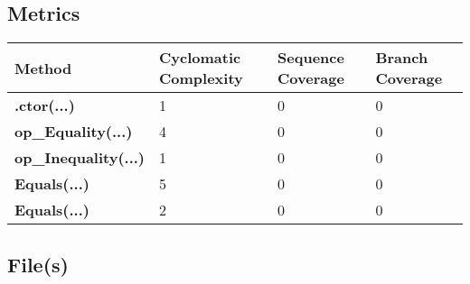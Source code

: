 \documentclass[a4paper,10pt]{article}
\begin{document}
\subsection{Metrics}
\begin{longtable}[l]{|l|l|l|l|}
\hline
\textbf{Method} & \textbf{Cyclomatic Complexity} & \textbf{Sequence Coverage} & \textbf{Branch Coverage}\\
\hline
\textbf{.ctor(...)} & 1 & 0 & 0\\
\hline
\textbf{op\_Equality(...)} & 4 & 0 & 0\\
\hline
\textbf{op\_Inequality(...)} & 1 & 0 & 0\\
\hline
\textbf{Equals(...)} & 5 & 0 & 0\\
\hline
\textbf{Equals(...)} & 2 & 0 & 0\\
\hline
\end{longtable}
\subsection{File(s)}
\end{document}
